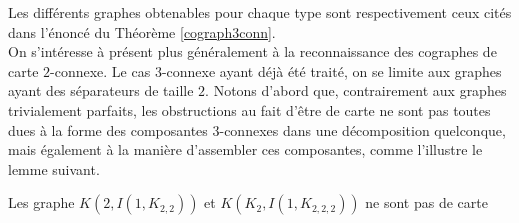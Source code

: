 \documentclass{scrartcl}
\begin{document}
\begin{flushleft}
Les différents graphes obtenables pour chaque type sont respectivement ceux cités dans l'énoncé du Théorème \ref{cograph3conn}.\\
On s'intéresse à présent plus généralement à la reconnaissance des cographes de carte $2$-connexe. Le cas $3$-connexe ayant déjà été traité,
on se limite aux graphes ayant des séparateurs de taille $2$. Notons d'abord que, contrairement aux graphes trivialement parfaits, les
obstructions au fait d'être de carte ne sont pas toutes dues à la forme des composantes $3$-connexes dans une décomposition quelconque,
mais également à la manière d'assembler ces composantes, comme l'illustre le lemme suivant.

\begin{lem}\label{2connstrictForbid}
    Les graphe $K(2, I(1, K_{2,2}))$ et $K(K_2, I(1, K_{2,2,2}))$ ne sont pas de carte
\end{lem}


\end{flushleft}
\end{document}
